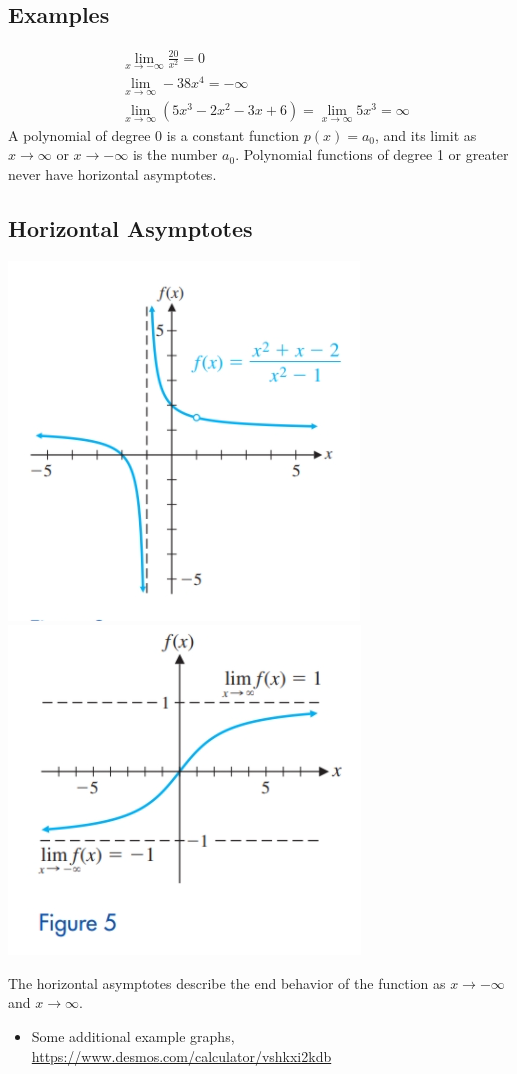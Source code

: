 \documentclass[14pt]{extarticle}
\begin{document}
\subsection{Examples}
\begin{align*}
	&\lim_{x\to -\infty} \frac{20}{x^2}  = 0 \\
	&\lim_{x\to\infty} -38 x^4 = -\infty \\
	&\lim_{x\to\infty}(5x^3 -2x^2 -3x+6) = \lim_{x\to\infty}5x^3 = \infty
\end{align*}
A polynomial of degree 0 is a constant function $p(x) = a_0$, and its limit as $x\to \infty$ or $x\to -\infty$ is the number $a_0$. Polynomial functions of degree 1 or greater never have horizontal asymptotes.

\subsection{Horizontal Asymptotes}
\begin{center}
	\includegraphics[width=0.4\linewidth]{9-2-1}
	\includegraphics[width=0.4\linewidth]{9-2-4}
\end{center}
The horizontal asymptotes describe the end behavior of the function as $x\to -\infty$ and $x\to \infty$.

\begin{itemize}
	\item Some additional example graphs, \url{https://www.desmos.com/calculator/vshkxi2kdb}
\end{itemize}
\end{document}
